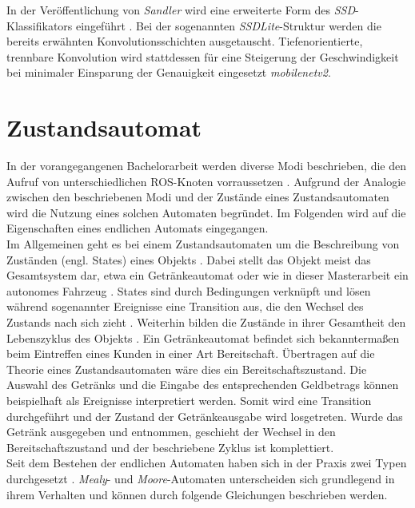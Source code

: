 		In der Veröffentlichung von \textit{Sandler} wird eine erweiterte Form des \textit{SSD}-Klassifikators eingeführt \cite{mobilenetv2}. Bei der sogenannten \textit{SSDLite}-Struktur werden die bereits erwähnten Konvolutionsschichten ausgetauscht. Tiefenorientierte, trennbare Konvolution wird stattdessen für eine Steigerung der Geschwindigkeit bei minimaler Einsparung der Genauigkeit eingesetzt \textit{mobilenetv2}.     		
		
		
		
		  			
	

			
	\section{Zustandsautomat}
	\label{sec: Zustandautomat}
	In der vorangegangenen Bachelorarbeit werden diverse Modi beschrieben, die den Aufruf von unterschiedlichen ROS-Knoten vorraussetzen \cite{Bachelorarbeit}. Aufgrund der Analogie zwischen den beschriebenen Modi und der Zustände eines Zustandsautomaten wird die Nutzung eines solchen Automaten begründet. Im Folgenden wird auf die Eigenschaften eines endlichen Automats eingegangen.\\
	
	Im Allgemeinen geht es bei einem Zustandsautomaten um die Beschreibung von Zuständen (engl. States) eines Objekts \cite{uml}. Dabei stellt das Objekt meist das Gesamtsystem dar, etwa ein Getränkeautomat oder wie in dieser Masterarbeit ein autonomes Fahrzeug \cite{uml}. States sind durch Bedingungen verknüpft und lösen während sogenannter Ereignisse eine Transition aus, die den Wechsel des Zustands nach sich zieht \cite{uml}. Weiterhin bilden die Zustände in ihrer Gesamtheit den Lebenszyklus des Objekts \cite{uml}. Ein Getränkeautomat befindet sich bekanntermaßen beim Eintreffen eines Kunden in einer Art Bereitschaft. Übertragen auf die Theorie eines Zustandsautomaten wäre dies ein Bereitschaftszustand. Die Auswahl des Getränks und die Eingabe des entsprechenden Geldbetrags können beispielhaft als Ereignisse interpretiert werden. Somit wird eine Transition durchgeführt und der Zustand der Getränkeausgabe wird losgetreten. Wurde das Getränk ausgegeben und entnommen, geschieht der Wechsel in den Bereitschaftszustand und der beschriebene Zyklus ist komplettiert.\\
	
	Seit dem Bestehen der endlichen Automaten haben sich in der Praxis zwei Typen durchgesetzt \cite{mooremealy}. \textit{Mealy}- und \textit{Moore}-Automaten unterscheiden sich grundlegend in ihrem Verhalten und können durch folgende Gleichungen beschrieben werden.\\
	
